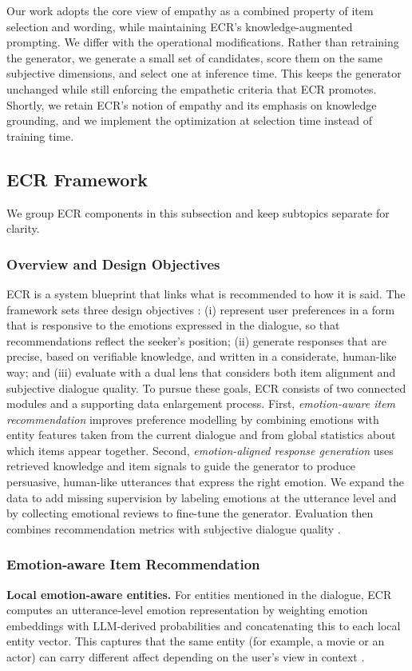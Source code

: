 \documentclass[12pt]{article}
\begin{document}
  Our work adopts the core view of empathy as a combined property of item selection and wording, while maintaining ECR's knowledge-augmented prompting. We differ with the operational modifications. Rather than retraining the generator, we generate a small set of candidates, score them on the same subjective dimensions, and select one at inference time. This keeps the generator unchanged while still enforcing the empathetic criteria that ECR promotes. Shortly, we retain ECR's notion of empathy and its emphasis on knowledge grounding, and we implement the optimization at selection time instead of training time.
  
  \subsection{ECR Framework}
  We group ECR components in this subsection and keep subtopics separate for clarity.
  \subsubsection{Overview and Design Objectives}
  ECR is a system blueprint that links what is recommended to how it is said. The framework sets three design objectives \citep{zhang2024ecr}: (i) represent user preferences in a form that is responsive to the emotions expressed in the dialogue, so that recommendations reflect the seeker's position; (ii) generate responses that are precise, based on verifiable knowledge, and written in a considerate, human-like way; and (iii) evaluate with a dual lens that considers both item alignment and subjective dialogue quality. To pursue these goals, ECR consists of two connected modules and a supporting data enlargement process. First, \emph{emotion-aware item recommendation} improves preference modelling by combining emotions with entity features taken from the current dialogue and from global statistics about which items appear together. Second, \emph{emotion-aligned response generation} uses retrieved knowledge and item signals to guide the generator to produce persuasive, human-like utterances that express the right emotion. We expand the data to add missing supervision by labeling emotions at the utterance level and by collecting emotional reviews to fine-tune the generator. Evaluation then combines recommendation metrics with subjective dialogue quality \citep{zhang2024ecr}.
  
  \subsubsection{Emotion‑aware Item Recommendation}
  \textbf{Local emotion‑aware entities.} For entities mentioned in the dialogue, ECR computes an utterance‑level emotion representation by weighting emotion embeddings with LLM‑derived probabilities and concatenating this to each local entity vector. This captures that the same entity (for example, a movie or an actor) can carry different affect depending on the user's view in context \citep{zhang2024ecr}.
  
\end{document}
